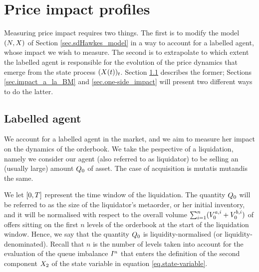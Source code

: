 \documentclass[10pt, article,table]{article}
\begin{document}
\section{Price impact profiles}\label{sec.price_impact_profiles}

Measuring price impact requires two things. The first is to modify the  model $(\multiCountingProc,\stateVariable)$ of Section \ref{sec.sdHawkes_model} in a way to account for a labelled agent, whose impact we wish to measure. The second is to extrapolate to which extent the labelled agent is responsible for the evolution of the price dynamics that emerge from the state process $(\stateVariable(t))_{t}$.  Section \ref{sec.labelled_agent} describes the former; Sections \ref{sec.impact_a_la_BM} and \ref{sec.one-side_impact} will present two different ways to do the latter.

\subsection{Labelled agent}\label{sec.labelled_agent}
We account for a labelled agent in the market, and we aim to measure her impact on the dynamics of the orderbook. We take the pespective of a liquidation, namely we consider our agent (also referred to as liquidator) to be selling an (usually large) amount $\metaorderSize$ of asset. The case of acquisition is mutatis mutandis the same. 

We let $\timeWindow$ represent the time window of the liquidation. The quantity $\metaorderSize$ will be referred to as the size of the liquidator's metaorder, or her initial inventory, and it will be normalised with respect to the overall volume $\sum_{i=1}^{n}(\nthBestAskVolume[i]_{0} + \nthBestBidVolume[i]_{0})$ of offers sitting on the first $n$ levels of the orderbook  at the start of the liquidation window. Hence, we say that the quantity $\metaorderSize$ is liquidity-normalised (or liquidity-denominated). Recall that $n$ is the number of levels taken into account for the evaluation of the queue imbalance $\volumeImbalance^n$ that enters the definition of the second component $\stateVariable_2$ of the state variable in equation \eqref{eq.state-variable}.     
\end{document}
